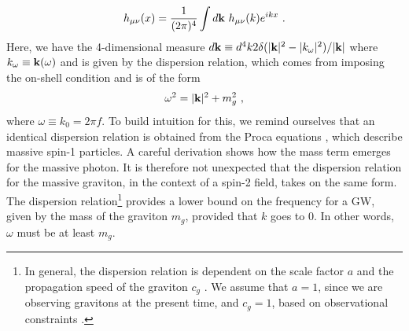 \documentclass[prd,twocolumn,aps,psfig,nofootinbib,nobibnotes,superscriptaddress,preprintnumbers,times]{revtex4-2}
\begin{document}
\begin{equation}\label{eqn:planewave}
    h_{\mu\nu}(x) = \frac{1}{(2\pi)^4}\int d{\bf k} \ h_{\mu\nu}(k) e^{ikx} \ .
\end{equation}
Here, we have the 4-dimensional measure $d{\bf k} \equiv d^4 k 2\delta(|{\bf k}|^2 - |k_{\omega}|^2)/|{\bf k}|$ where $k_{\omega} \equiv {\bf k}(\omega)$ and is given by the dispersion relation, which comes from imposing the on-shell condition \cite{Liang:2021bct} and is of the form 
\begin{equation}\label{eq:dispersion}
    \omega^2 = |{\bf k}|^2+ m_g^2 \ ,
\end{equation}
where $\omega \equiv k_0 = 2\pi f$.
To build intuition for this, we remind ourselves that an identical dispersion relation is obtained from the Proca equations \cite{Proca:1936fbw}, which describe massive spin-1 particles. A careful derivation shows how the mass term emerges \cite{Wang:2024kir} for the massive photon. It is therefore not unexpected that the dispersion relation for the massive graviton, in the context of a spin-2 field, takes on the same form. 
The dispersion relation\footnote{In general, the dispersion relation is dependent on the scale factor $a$ and the propagation speed of the graviton $c_g$ \cite{Gumrukcuoglu:2012wt}. We assume that $a=1$, since we are observing gravitons at the present time, and $c_g = 1$, based on observational constraints \cite{LIGOScientific:2017vwq, LIGOScientific:2017zic, LIGOScientific:2017ync}.} provides a lower bound on the frequency for a GW, given by the mass of the graviton $m_g$, provided that $k$ goes to 0. In other words, $\omega$ must be at least $m_g$. 
\end{document}
